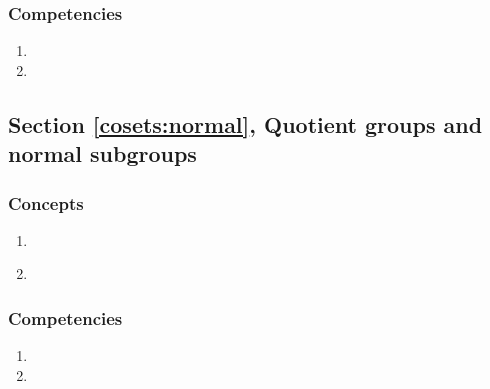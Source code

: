 \subsubsection*{Competencies}
\begin{enumerate}
\item
\item
\end{enumerate}


\subsection*{Section \ref{cosets:normal}, Quotient groups and normal subgroups}
\subsubsection*{Concepts}
\begin{enumerate}
\item 
\
\
\
\item
\end{enumerate}

\subsubsection*{Competencies}
\begin{enumerate}
\item
\item
\end{enumerate}





